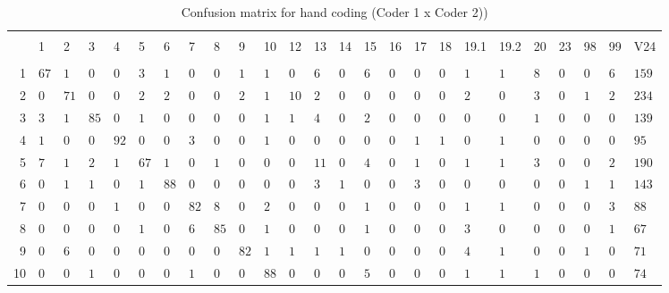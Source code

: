 
\begin{table}[!htbp] \centering 
  \caption{Confusion matrix for hand coding (Coder 1 x Coder 2))} 
  \label{tab:confusion-hand} 
\begin{tabularx}{\textwidth}{r|XXXXXXXXXXXXXXXXXXXXXXXX} 
\\[-1.8ex]\hline 
\hline \\[-1.8ex] 
 & 1 & 2 & 3 & 4 & 5 & 6 & 7 & 8 & 9 & 10 & 12 & 13 & 14 & 15 & 16 & 17 & 18 & 19.1 & 19.2 & 20 & 23 & 98 & 99 & V24 \\ 
\hline \\[-1.8ex] 
1 & $67$ & $1$ & $0$ & $0$ & $3$ & $1$ & $0$ & $0$ & $1$ & $1$ & $0$ & $6$ & $0$ & $6$ & $0$ & $0$ & $0$ & $1$ & $1$ & $8$ & $0$ & $0$ & $6$ & $159$ \\ 
2 & $0$ & $71$ & $0$ & $0$ & $2$ & $2$ & $0$ & $0$ & $2$ & $1$ & $10$ & $2$ & $0$ & $0$ & $0$ & $0$ & $0$ & $2$ & $0$ & $3$ & $0$ & $1$ & $2$ & $234$ \\ 
3 & $3$ & $1$ & $85$ & $0$ & $1$ & $0$ & $0$ & $0$ & $0$ & $1$ & $1$ & $4$ & $0$ & $2$ & $0$ & $0$ & $0$ & $0$ & $0$ & $1$ & $0$ & $0$ & $0$ & $139$ \\ 
4 & $1$ & $0$ & $0$ & $92$ & $0$ & $0$ & $3$ & $0$ & $0$ & $1$ & $0$ & $0$ & $0$ & $0$ & $0$ & $1$ & $1$ & $0$ & $1$ & $0$ & $0$ & $0$ & $0$ & $95$ \\ 
5 & $7$ & $1$ & $2$ & $1$ & $67$ & $1$ & $0$ & $1$ & $0$ & $0$ & $0$ & $11$ & $0$ & $4$ & $0$ & $1$ & $0$ & $1$ & $1$ & $3$ & $0$ & $0$ & $2$ & $190$ \\ 
6 & $0$ & $1$ & $1$ & $0$ & $1$ & $88$ & $0$ & $0$ & $0$ & $0$ & $0$ & $3$ & $1$ & $0$ & $0$ & $3$ & $0$ & $0$ & $0$ & $0$ & $0$ & $1$ & $1$ & $143$ \\ 
7 & $0$ & $0$ & $0$ & $1$ & $0$ & $0$ & $82$ & $8$ & $0$ & $2$ & $0$ & $0$ & $0$ & $1$ & $0$ & $0$ & $0$ & $1$ & $1$ & $0$ & $0$ & $0$ & $3$ & $88$ \\ 
8 & $0$ & $0$ & $0$ & $0$ & $1$ & $0$ & $6$ & $85$ & $0$ & $1$ & $0$ & $0$ & $0$ & $1$ & $0$ & $0$ & $0$ & $3$ & $0$ & $0$ & $0$ & $0$ & $1$ & $67$ \\ 
9 & $0$ & $6$ & $0$ & $0$ & $0$ & $0$ & $0$ & $0$ & $82$ & $1$ & $1$ & $1$ & $1$ & $0$ & $0$ & $0$ & $0$ & $4$ & $1$ & $0$ & $0$ & $1$ & $0$ & $71$ \\ 
10 & $0$ & $0$ & $1$ & $0$ & $0$ & $0$ & $1$ & $0$ & $0$ & $88$ & $0$ & $0$ & $0$ & $5$ & $0$ & $0$ & $0$ & $1$ & $1$ & $1$ & $0$ & $0$ & $0$ & $74$ \\ 

\end{tabularx}
\end{table}
